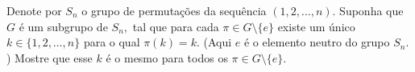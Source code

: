Denote por \(S_n\) o grupo de permutações da sequência \((1,2,\dots,n).\) Suponha que \(G\) é um subgrupo de \(S_n,\) tal que para cada \(\pi\in G\setminus\{e\}\) existe um único \(k\in \{1,2,\dots,n\}\) para o qual \(\pi(k)=k.\) (Aqui \(e\) é o elemento neutro do grupo \(S_n.\)) Mostre que esse \(k\) é o mesmo para todos os \(\pi \in G\setminus \{e\}.\)

